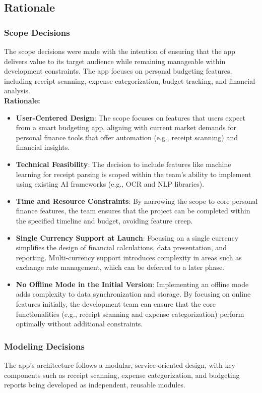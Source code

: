 \documentclass[12pt]{article}
\begin{document}
\newpage

\subsection{Rationale}

\subsubsection{Scope Decisions}
The scope decisions were made with the intention of ensuring that the app delivers value to its target audience while remaining manageable within development constraints. The app focuses on personal budgeting features, including receipt scanning, expense categorization, budget tracking, and financial analysis. \\

\noindent\textbf{Rationale:}
\begin{itemize}
    \item \textbf{User-Centered Design}: The scope focuses on features that users expect from a smart budgeting app, aligning with current market demands for personal finance tools that offer automation (e.g., receipt scanning) and financial insights.
    \item \textbf{Technical Feasibility}: The decision to include features like machine learning for receipt parsing is scoped within the team’s ability to implement using existing AI frameworks (e.g., OCR and NLP libraries).
    \item \textbf{Time and Resource Constraints}: By narrowing the scope to core personal finance features, the team ensures that the project can be completed within the specified timeline and budget, avoiding feature creep.
    \item \textbf{Single Currency Support at Launch}: Focusing on a single currency simplifies the design of financial calculations, data presentation, and reporting. Multi-currency support introduces complexity in areas such as exchange rate management, which can be deferred to a later phase.
    \item \textbf{No Offline Mode in the Initial Version}: Implementing an offline mode adds complexity to data synchronization and storage. By focusing on online features initially, the development team can ensure that the core functionalities (e.g., receipt scanning and expense categorization) perform optimally without additional constraints.
\end{itemize}

\subsubsection{Modeling Decisions}
The app’s architecture follows a modular, service-oriented design, with key components such as receipt scanning, expense categorization, and budgeting reports being developed as independent, reusable modules.\\
\end{document}

